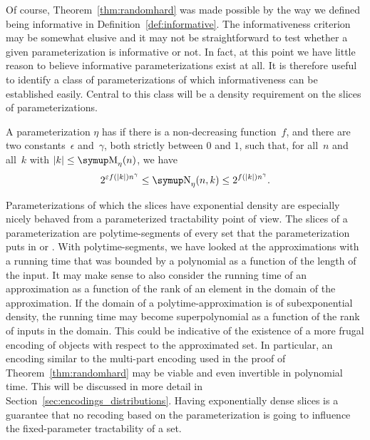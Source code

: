 Of course, Theorem~\ref{thm:randomhard} was made possible by the way we defined being informative in Definition~\ref{def:informative}.
The informativeness criterion may be somewhat elusive and it may not be straightforward to test whether a given parameterization is informative or not.
In fact, at this point we have little reason to believe informative parameterizations exist at all.
It is therefore useful to identify a class of parameterizations of which informativeness can be established easily.
Central to this class will be a density requirement on the slices of parameterizations.
\begin{definition}
  A parameterization $\eta$ has  if there is a non-decreasing function~$f$, and there are two constants~$\epsilon$ and~$\gamma$, both strictly between $0$ and $1$, such that, for all~$n$ and all~$k$ with $\length{k} \le \upM_\eta(n)$, we have
\begin{equation*}
  2^{\epsilon f(\length{k}) n^\gamma} \le \upN_\eta(n, k) \le 2^{f(\length{k}) n^\gamma}.
\end{equation*}
\end{definition}

Parameterizations of which the slices have exponential density are especially nicely behaved from a parameterized tractability point of view.
The slices of a parameterization are polytime-segments of every set that the parameterization puts in  or .
With polytime-segments, we have looked at the approximations with a running time that was bounded by a polynomial as a function of the length of the input.
It may make sense to also consider the running time of an approximation as a function of the rank of an element in the domain of the approximation.
If the domain of a polytime-approximation is of subexponential density, the running time may become superpolynomial as a function of the rank of inputs in the domain.
This could be indicative of the existence of a more frugal encoding of objects with respect to the approximated set.
In particular, an encoding similar to the multi-part encoding used in the proof of Theorem~\ref{thm:randomhard} may be viable and even invertible in polynomial time.
This will be discussed in more detail in Section~\ref{sec:encodings_distributions}.
Having exponentially dense slices is a guarantee that no recoding based on the parameterization is going to influence the fixed-parameter tractability of a set.

